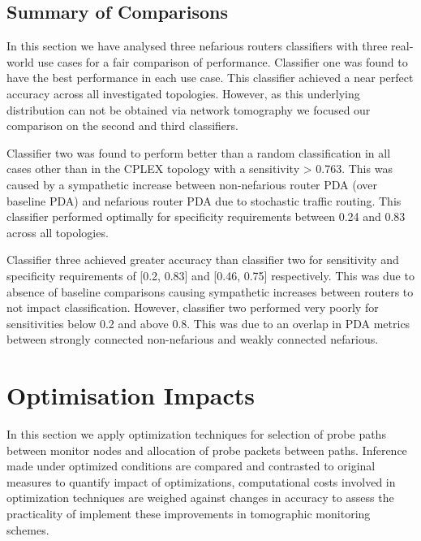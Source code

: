 \subsection{Summary of Comparisons}
\label{ssec:Rnefidsummary}
In this section we have analysed three nefarious routers classifiers with three real-world use cases for a fair comparison of performance. Classifier one was found to have the best performance in each use case. This classifier achieved a near perfect accuracy across all investigated topologies. However, as this underlying distribution can not be obtained via network tomography we focused our comparison on the second and third classifiers.\par
Classifier two was found to perform better than a random classification in all cases other than in the CPLEX topology with a sensitivity > 0.763. This was caused by a sympathetic increase between non-nefarious router PDA (over baseline PDA) and nefarious router PDA due to stochastic traffic routing. This classifier performed optimally for specificity requirements between 0.24 and 0.83 across all topologies.\par
Classifier three achieved greater accuracy than classifier two for sensitivity and specificity requirements of [0.2, 0.83] and [0.46, 0.75] respectively. This was due to absence of baseline comparisons causing sympathetic increases between routers to not impact classification. However, classifier two performed very poorly for sensitivities below 0.2 and above 0.8. This was due to an overlap in PDA metrics between strongly connected non-nefarious and weakly connected nefarious.

\section{Optimisation Impacts}
\label{sec:Rprobingoptimality}
In this section we apply optimization techniques for selection of probe paths between monitor nodes and allocation of probe packets between paths. Inference made under optimized conditions are compared and contrasted to original measures to quantify impact of optimizations, computational costs involved in optimization techniques are weighed against changes in accuracy to assess the practicality of implement these improvements in tomographic monitoring schemes.

